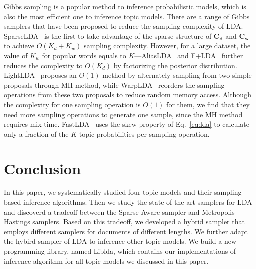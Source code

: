 \documentclass[10pt,journal,cspaper,compsoc]{IEEEtran}
\begin{document}
Gibbs sampling is a popular method to inference probabilistic models, which is also the most efficient one to inference topic models. There are a range of Gibbs samplers that
have been proposed to reduce the sampling complexity
of LDA. SparseLDA~\cite{yao2009efficient} is the
first to take advantage of the sparse structure of
$\mathbf{C_d}$ and $\mathbf{C_w}$ to achieve
$O(K_d + K_w)$ sampling complexity.
However, for a large dataset, the value of $K_w$ for popular words equals to $K$---AliasLDA~\cite{li2014reducing} and F+LDA~\cite{yu2015scalable}
further reduces the complexity to $O(K_d)$ by factorizing
the posterior distribution.
LightLDA~\cite{yuan2015lightlda} proposes an $O(1)$ method by alternately sampling from two simple proposals through MH method, while
WarpLDA~\cite{chen2016warplda} reorders the sampling operations from these two proposals to reduce random memory access.
Although the complexity for one sampling operation is $O(1)$ for them,
we find that they need more sampling operations to generate one sample, since the MH method requires mix time.
FastLDA~\cite{porteous2008fast} uses the skew
property of Eq.~\ref{eq:lda} to calculate only a fraction of
the $K$ topic probabilities per sampling operation. 

\section{Conclusion}
\label{sec:conclude}
In this paper, we systematically studied four topic models and
their sampling-based inference algorithms. Then we study the state-of-the-art samplers for LDA and discoverd a tradeoff
between the Sparse-Aware sampler and Metropolis-Hastings samplers.
Based on this tradeoff, we developed a hybrid sampler that employs different samplers for documents of different lengths.
We further adapt the hybird sampler of LDA to inference other topic models. 
We build a new programming library, named Liblda, which contains our implementations of inference algorithm for all topic models we
discussed in this paper.


{}

\end{document}
